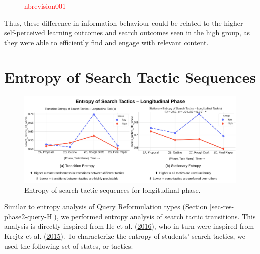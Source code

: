 \documentclass[letterpaper, nobind]{templates/ociamthesis}
\begin{document}
\textcolor{red}{-------- nbrevision001 --------}

Thus, these difference in information behaviour could be related to the higher self-perceived learning outcomes and search outcomes seen in the high group, as they were able to efficiently find and engage with relevant content.

\hypertarget{entropy-of-search-tactic-sequences}{%
\section{Entropy of Search Tactic Sequences}\label{entropy-of-search-tactic-sequences}}

\begin{figure}

{\centering \includegraphics[width=1\linewidth]{figs/rp2-tactic-entropy} 

}

\caption[Entropy of search tactic sequences for longitudinal phase.]{Entropy of search tactic sequences for longitudinal phase.}\label{fig:rp2-tactic-entropy}
\end{figure}





Similar to entropy analysis of Query Reformulation types (Section \ref{sec-res-phase2-query-H}), we performed entropy analysis of search tactic transitions.
This analysis is directly inspired from He et al. (\protect\hyperlink{ref-he2016beyond}{2016}), who in turn were inspired from Krejtz et al. (\protect\hyperlink{ref-krejtz2015gaze}{2015}).
To characterize the entropy of students' search tactics, we used the following set of states, or tactics:
\end{document}
